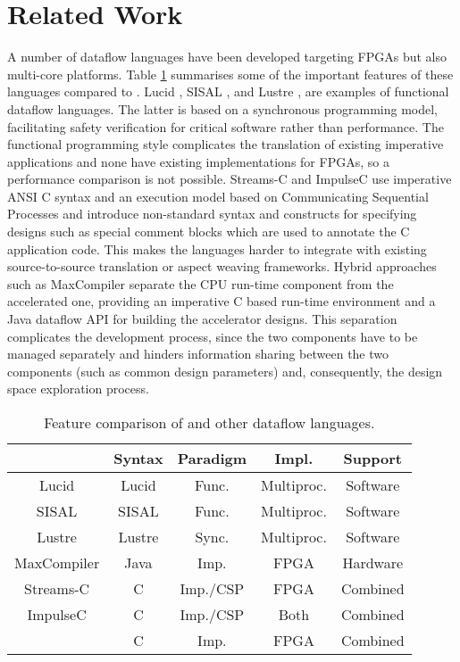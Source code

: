 \section{Related Work}

A number of dataflow languages have been developed targeting FPGAs but
also multi-core platforms. Table \ref{table:feature-comparison}
summarises some of the important features of these languages compared
to \MAXC{}. Lucid \cite{ashcroft1977lucid}, SISAL
\cite{gurd1987implicit}, \cite{mcgraw1983sisal} and Lustre
\cite{halbwachs1991synchronous}, are examples of functional dataflow
languages. The latter is based on a synchronous programming model,
facilitating safety verification for critical software
\cite{halbwachs1992programming} rather than performance. The
functional programming style complicates the translation of existing
imperative applications and none have existing implementations for
FPGAs, so a performance comparison is not possible.
Streams-C\cite{Gokhale:Stone:Arnold:Kalinowski:2000} and
ImpulseC\cite{ImpulseC} use imperative ANSI C syntax and an execution
model based on Communicating Sequential Processes and introduce
non-standard syntax and constructs for specifying designs such as
special comment blocks which are used to annotate the C application
code. This makes the languages harder to integrate with existing
source-to-source translation or aspect weaving frameworks. Hybrid
approaches such as MaxCompiler \cite{MaxelerTechnologies:2012}
separate the CPU run-time component from the accelerated one, providing
an imperative C based run-time environment and a Java dataflow API for
building the accelerator designs. This separation complicates the
development process, since the two components have to be managed
separately and hinders information sharing between the two components
(such as common design parameters) and, consequently, the design space
exploration process.

\begin{table}[!h]
  \renewcommand{\arraystretch}{1.2}
  \centering
  \caption{Feature comparison of \MAXC{} and other dataflow languages.}
  \label{table:feature-comparison}
  \begin{tabular}{ c |  c |  c |  c |  c }
    \hline
    \           & \bf{Syntax} & \bf{Paradigm} & \bf{Impl.} & \bf{Support} \\
    \hline \hline
    Lucid       & Lucid       & Func.         & Multiproc. & Software     \\
    SISAL       & SISAL       & Func.         & Multiproc. & Software     \\
    Lustre      & Lustre      & Sync.         & Multiproc. & Software     \\
    MaxCompiler & Java        & Imp.          & FPGA       & Hardware     \\
    Streams-C   & C           & Imp./CSP      & FPGA       & Combined     \\
    ImpulseC    & C           & Imp./CSP      & Both       & Combined     \\
    \MAXC{}     & C           & Imp.          & FPGA       & Combined     \\
  \end{tabular}
\end{table}


